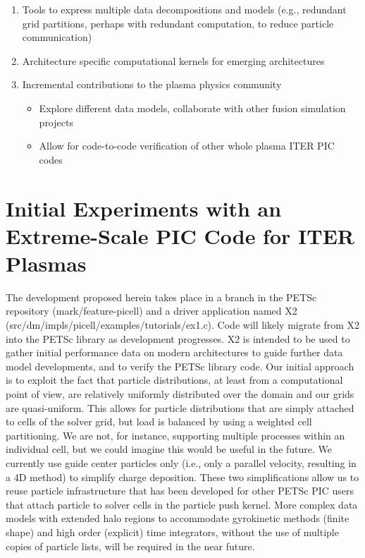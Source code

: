 \documentclass[review]{siamart}
\begin{document}
\begin{itemize}
\begin{enumerate}
\item Tools to express multiple data decompositions and models (e.g., redundant grid partitions, perhaps with redundant computation, to reduce particle communication)
\item Architecture specific computational kernels for emerging architectures \cite{KnepleyBrownMcInnesSmithRuppAdams2015}
\item Incremental contributions to the plasma physics community
\begin{itemize}
\item Explore different data models, collaborate with other fusion simulation projects
\item Allow for code-to-code verification of other whole plasma ITER PIC codes
\end{itemize}
\end{enumerate}
\end{itemize}

\section{Initial Experiments with an Extreme-Scale PIC Code for ITER Plasmas}
\label{sec:x2}

The development proposed herein takes place in a branch in the PETSc repository (mark/feature-picell) and a driver application named X2 (src/dm/impls/picell/examples/tutorials/ex1.c).
Code will likely migrate from X2 into the PETSc library as development progresses.
X2 is intended to be used to gather initial performance data on modern architectures to guide further data model developments, and to verify the PETSc library code.
Our initial approach is to exploit the fact that particle distributions, at least from a computational point of view, are relatively uniformly distributed over the domain and our grids are quasi-uniform.
This allows for particle distributions that are simply attached to cells of the solver grid, but load is balanced by using a weighted cell partitioning.
We are not, for instance, supporting multiple processes within an individual cell, but we could imagine this would be useful in the future.
We currently use guide center particles only (i.e., only a parallel velocity, resulting in a 4D method) to simplify charge deposition.
These two simplifications allow us to reuse particle infrastructure that has been developed for other PETSc PIC users \cite{may2014ptatin} that attach particle to solver cells in the particle push kernel.
More complex data models with extended halo regions to accommodate gyrokinetic methods (finite shape) and high order (explicit) time integrators, without the use of multiple copies of particle lists, will be required in the near future.
\end{document}
